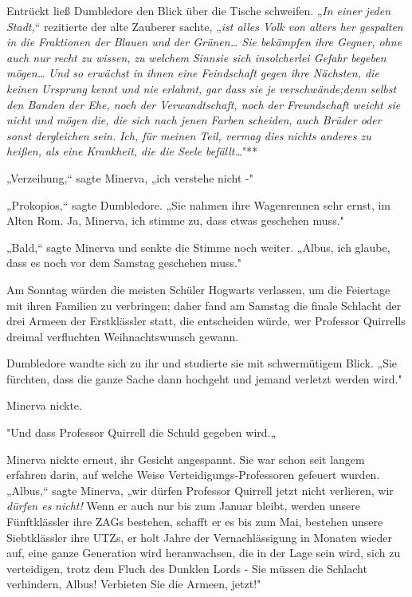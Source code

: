 {Entrückt ließ Dumbledore den Blick über die Tische schweifen. „\emph{In einer jeden Stadt,}“ rezitierte der alte Zauberer sachte, „\emph{ist alles Volk von alters her gespalten in die Fraktionen der Blauen und der Grünen… Sie bekämpfen ihre Gegner, ohne auch nur recht zu wissen,} \emph{zu} \emph{welchem} \emph{Sinnsie sich insolcherlei Gefahr} \emph{begeben} \emph{mögen…} \emph{Und so} \emph{erwächst in ihnen eine Feindschaft gegen ihre Nächsten, die keinen} \emph{Ursprung} \emph{kennt und nie} \emph{erlahmt,} \emph{gar} \emph{dass sie je verschwände;denn} \emph{selbst den Banden der Ehe, noch der Verwandtschaft, noch der Freundschaft} \emph{weicht sie nicht} \emph{und mögen die, die sich nach jenen Farben scheiden, auch Brüder oder sonst dergleichen sein.} \emph{Ich, für meinen Teil, vermag dies nichts anderes zu heißen, als eine Krankheit, die die Seele befällt…}"**

„Verzeihung,“ sagte Minerva, „ich verstehe nicht -"

„Prokopios,“ sagte Dumbledore. „Sie nahmen ihre Wagenrennen sehr ernst, im Alten Rom. Ja, Minerva, ich stimme zu, dass etwas geschehen muss."

„Bald,“ sagte Minerva und senkte die Stimme noch weiter. „Albus, ich glaube, dass es noch vor dem Samstag geschehen muss."

Am Sonntag würden die meisten Schüler Hogwarts verlassen, um die Feiertage mit ihren Familien zu verbringen; daher fand am Samstag die finale Schlacht der drei Armeen der Erstklässler statt, die entscheiden würde, wer Professor Quirrells dreimal verfluchten Weihnachtswunsch gewann.

Dumbledore wandte sich zu ihr und studierte sie mit schwermütigem Blick. „Sie fürchten, dass die ganze Sache dann hochgeht und jemand verletzt werden wird."

Minerva nickte.

"Und dass Professor Quirrell die Schuld gegeben wird.„

Minerva nickte erneut, ihr Gesicht angespannt. Sie war schon seit langem erfahren darin, auf welche Weise Verteidigungs-Professoren gefeuert wurden. „Albus,“ sagte Minerva, „wir dürfen Professor Quirrell jetzt nicht verlieren, wir \emph{dürfen es} \emph{nicht!} Wenn er auch nur bis zum Januar bleibt, werden unsere Fünftklässler ihre ZAGs bestehen, schafft er es bis zum Mai, bestehen unsere Siebtklässler ihre UTZs, er holt Jahre der Vernachlässigung in Monaten wieder auf, eine ganze Generation wird heranwachsen, die in der Lage sein wird, sich zu verteidigen, trotz dem Fluch des Dunklen Lords - Sie müssen die Schlacht verhindern, Albus! Verbieten Sie die Armeen, jetzt!"

}
